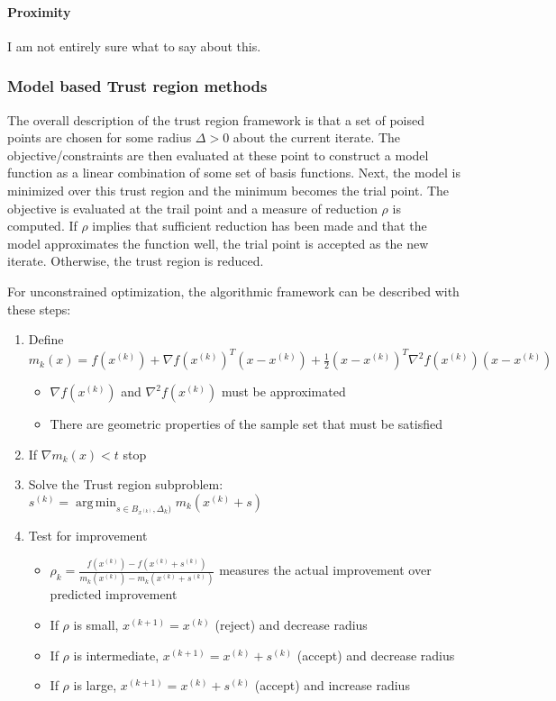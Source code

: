 \documentclass{article}
\DeclareMathOperator*{\argmin}{arg\,min}
\begin{document}
\paragraph{Proximity}

I am not entirely sure what to say about this.

\subsubsection{Model based Trust region methods}

The overall description of the trust region framework is that a set of poised points are chosen for some radius $\Delta>0$ about the current iterate.
The objective/constraints are then evaluated at these point to construct a model function as a linear combination of some set of basis functions.
Next, the model is minimized over this trust region and the minimum becomes the trial point.
The objective is evaluated at the trail point and a measure of reduction $\rho$ is computed.
If $\rho$ implies that sufficient reduction has been made and that the model approximates the function well, the trial point is accepted as the new iterate.
Otherwise, the trust region is reduced.


For unconstrained optimization, the algorithmic framework can be described with these steps:

\begin{enumerate}
	\item Define $m_k(x) = f(x^{(k)}) + \nabla f(x^{(k)})^T (x-x^{(k)}) + \frac 1 2 (x-x^{(k)})^T\nabla^2f(x^{(k)})(x-x^{(k)})$
	\begin{itemize}
		\item $\nabla f(x^{(k)})$ and $\nabla^2 f(x^{(k)})$ must be approximated
		\item There are geometric properties of the sample set that must be satisfied
	\end{itemize}
	\item If $\nabla m_k(x) < t$ stop
	\item Solve the Trust region subproblem: $s^{(k)} = \argmin_{s\in B_{x^{(k)}}, \Delta_k)} m_k(x^{(k)} + s)$
	\item Test for improvement
	\begin{itemize}
		\item $\rho_k = \frac{f(x^{(k)}) - f(x^{(k)}+s^{(k)})}{m_k(x^{(k)}) - m_k(x^{(k)}+s^{(k)})}$ measures the actual improvement over predicted improvement
		\item If $\rho$ is small, $x^{(k+1)}=x^{(k)}$ (reject) and decrease radius
		\item If $\rho$ is intermediate, $x^{(k+1)}=x^{(k)}+s^{(k)}$ (accept) and decrease radius
		\item If $\rho$ is large, $x^{(k+1)}=x^{(k)}+s^{(k)}$ (accept) and increase radius
	\end{itemize}
\end{enumerate}
\end{document}
